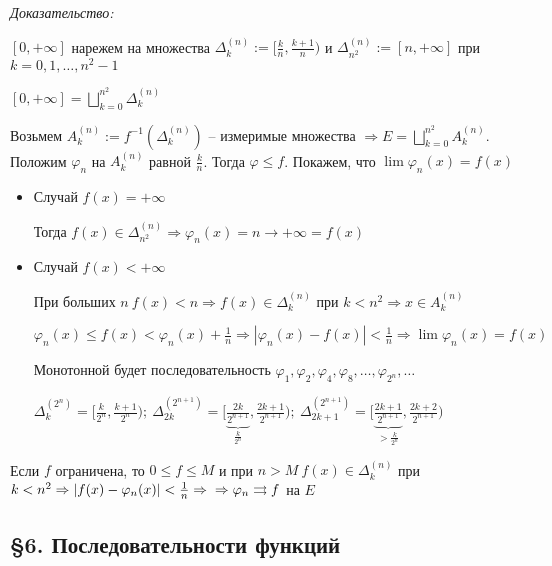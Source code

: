 \documentclass[12pt]{article}
\begin{document}
\textit{Доказательство:}

$[0, + \infty]$ нарежем на множества $\Delta_k^{(n)} := [\frac{k}{n}, \frac{k + 1}{n})$ и $\Delta_{n^2}^{(n)} := [n, + \infty]$ при $k = 0, 1, \ldots, n^2 - 1$

$[0, + \infty] = \bigsqcup\limits_{k = 0}^{n^2} \Delta_k^{(n)}$

Возьмем $A_k^{(n)} := f^{-1}(\Delta_k^{(n)})$ -- измеримые множества $\Rightarrow E = \bigsqcup\limits_{k = 0}^{n^2} A_k^{(n)}$. Положим $\varphi_n$ на $A_k^{(n)}$ равной $\frac{k}{n}$. Тогда $\varphi \leq f$. Покажем, что $\lim \varphi_n (x) = f(x)$

\begin{itemize}
    \item Случай $f(x) = + \infty$
    
    Тогда $f(x) \in \Delta_{n^2}^{(n)} \Rightarrow \varphi_n(x) = n \to + \infty = f(x)$

    \item Случай $f(x) < + \infty$
    
    При больших $n\ f(x) < n \Rightarrow f(x) \in \Delta_k^{(n)}$ при $k < n^2 \Rightarrow x \in A_k^{(n)}$

    $\varphi_n(x) \leq f(x) < \varphi_n(x) + \frac{1}{n} \Rightarrow |\varphi_n(x) - f(x)| < \frac{1}{n} \Rightarrow \lim \varphi_n(x) = f(x)$

    Монотонной будет последовательность $\varphi_1, \varphi_2, \varphi_4, \varphi_8, \ldots, \varphi_{2^n}, \ldots$

    $\Delta_k^{(2^n)} = [\frac{k}{2^n}, \frac{k + 1}{2^n});\ \Delta_{2k}^{(2^{n + 1})} = [\underbrace{\frac{2k}{2^{n + 1}}}_{\frac{k}{2^n}}, \frac{2k + 1}{2^{n + 1}});\ \Delta_{2k + 1}^{(2^{n + 1})} = [\underbrace{\frac{2k + 1}{2^{n + 1}}}_{> \frac{k}{2^n}}, \frac{2k + 2}{2^{n + 1}})$
\end{itemize}

Если $f$ ограничена, то $0 \leq f \leq M$ и при $n > M\ f(x) \in \Delta_k^{(n)}$ при $k < n^2 \Rightarrow |f(x) - \varphi_n(x)| < \frac{1}{n} \Rightarrow \\ \Rightarrow \varphi_n \rightrightarrows f$ на $E$

\newpage 

\subsection{\S 6. Последовательности функций}
\end{document}
